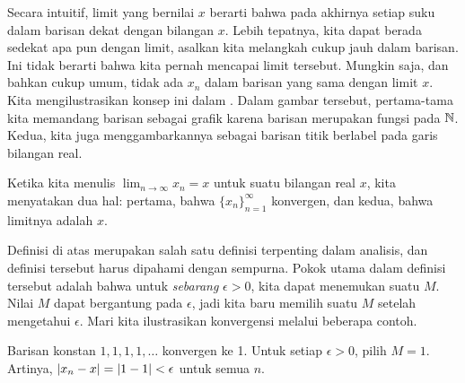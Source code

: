 Secara intuitif, limit yang bernilai $x$ berarti bahwa pada akhirnya
setiap suku dalam barisan dekat dengan bilangan $x$.  Lebih tepatnya,
kita dapat berada sedekat apa pun dengan limit, asalkan kita melangkah cukup jauh dalam
barisan.  Ini tidak berarti bahwa kita pernah mencapai limit tersebut.  Mungkin saja,
dan bahkan cukup umum, tidak ada $x_n$ dalam barisan yang sama dengan
limit $x$.
Kita mengilustrasikan konsep ini dalam .  Dalam
gambar tersebut, pertama-tama kita memandang barisan sebagai grafik karena barisan merupakan fungsi pada
${\mathbb{N}}$.   Kedua, kita juga menggambarkannya sebagai barisan titik berlabel pada garis
bilangan real.

\begin{myfigureht}
\caption{Ilustrasi konvergensi.
Di bagian atas, kita tampilkan sepuluh titik pertama barisan sebagai grafik
dengan $M$ dan interval di sekitar limit $x$ ditandai.
Di bagian bawah, titik-titik dari barisan yang sama ditandai pada
garis bilangan.\label{figsequenceconvergence}}
\end{myfigureht}

Ketika kita menulis $\lim_{n\to\infty} x_n = x$ untuk suatu bilangan real $x$, kita menyatakan dua
hal: pertama, bahwa $\{ x_n \}_{n=1}^\infty$ konvergen, dan kedua, bahwa limitnya adalah
$x$.

Definisi di atas merupakan salah satu definisi terpenting dalam analisis,
dan definisi tersebut harus dipahami dengan sempurna.  Pokok utama dalam
definisi tersebut adalah bahwa untuk \emph{sebarang} $\epsilon > 0$, kita dapat menemukan suatu $M$.  Nilai
$M$ dapat bergantung pada $\epsilon$, jadi kita baru memilih suatu $M$ setelah mengetahui
$\epsilon$.  Mari kita ilustrasikan konvergensi melalui beberapa contoh.

\begin{example}
Barisan konstan $1,1,1,1,\ldots$ konvergen ke 1.  Untuk
setiap $\epsilon > 0$, pilih $M = 1$.  Artinya, $\lvert {x_n-x} \rvert = \lvert {1-1} \rvert < \epsilon$ untuk semua $n$.
\end{example}

